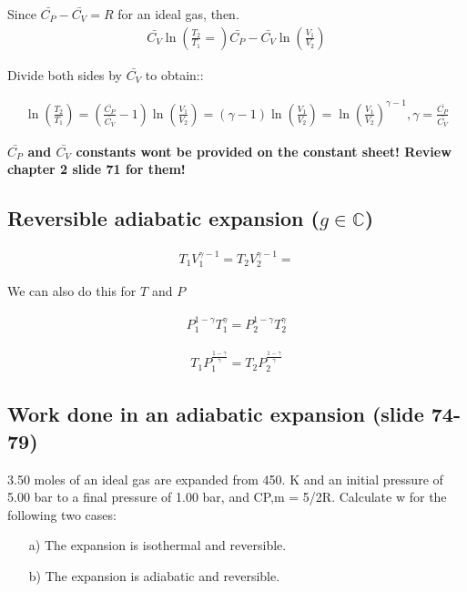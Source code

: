 \documentclass[12pt]{article}
\begin{document}
Since $\bar{C_P}-\bar{C_V}=R$ for an ideal gas, then.
\begin{align*}
    \bar{C_V}\ln(\frac{T_2}{T_1}=)\bar{C_P}-\bar{C_V}\ln(\frac{V_1}{V_2})
\end{align*}

Divide both sides by $\bar{C_V}$ to obtain::

\begin{align*}
    \ln(\frac{T_2}{T_1})=(\frac{\bar{C_P}}{\bar{C_V}}-1)\ln(\frac{V_1}{V_2})=(\gamma-1)\ln(\frac{V_1}{V_2})=\ln(\frac{V_1}{V_2})^{\gamma-1}, \gamma=\frac{\bar{C_P}}{\bar{C_V}}
\end{align*}

\textbf{$\bar{C_P}$ and $\bar{C_V}$ constants wont be provided on the constant sheet! Review chapter 2 slide 71 for them!}

\subsection*{Reversible adiabatic expansion ($g\in \mathbb{C}$)}

\begin{align*}
    T_1V_1^{\gamma-1}= T_2V_2^{\gamma-1}=
\end{align*}

We can also do this for $T$ and $P$

\begin{align*}
    P_1^{1-\gamma}T_1^{\gamma}=P_2^{1-\gamma}T_2^{\gamma}
\end{align*}

\begin{align*}
    T_1P_1^{\frac{1-\gamma}{\gamma}}=T_2P_2^{\frac{1-\gamma}{\gamma}}
\end{align*}

\subsection*{Work done in an adiabatic expansion (slide 74-79)}

3.50 moles of an ideal gas are expanded from 450. K and an initial pressure of 5.00 bar to a
final pressure of 1.00 bar, and CP,m = 5/2R. Calculate w for the following two cases:

\begin{itemize}
    \item[a)] The expansion is isothermal and reversible.
    \item[b)] The expansion is adiabatic and reversible.


\end{itemize}
\end{document}
